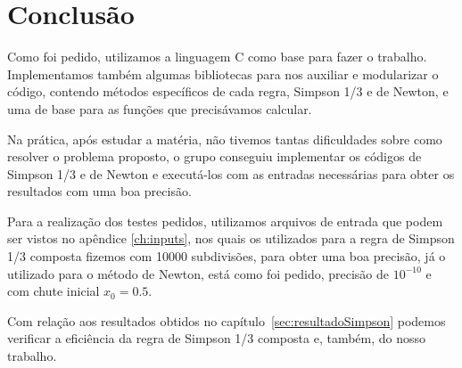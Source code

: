 \chapter*{Conclusão}
Como foi pedido, utilizamos a linguagem C como base para fazer o trabalho. Implementamos também algumas bibliotecas para nos auxiliar e modularizar o código, contendo métodos específicos de cada regra, Simpson 1/3 e de Newton, e uma de base para as funções que precisávamos calcular.

Na prática, após estudar a matéria, não tivemos tantas dificuldades sobre como resolver o problema proposto, o grupo conseguiu implementar os códigos de Simpson 1/3 e de Newton e executá-los com as entradas necessárias para obter os resultados com uma boa precisão.

Para a realização dos testes pedidos, utilizamos arquivos de entrada que podem ser vistos no apêndice \ref{ch:inputs}, nos quais os utilizados para a regra de Simpson 1/3 composta fizemos com 10000 subdivisões, para obter uma boa precisão, já o utilizado para o método de Newton, está como foi pedido, precisão de \(10^{-10}\) e com chute inicial \(x_0 = 0.5\).

Com relação aos resultados obtidos no capítulo~\ref{sec:resultadoSimpson} podemos verificar a eficiência da regra de Simpson 1/3 composta e, também, do nosso trabalho.